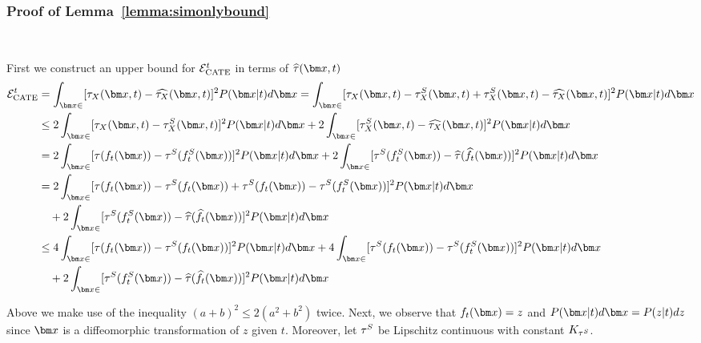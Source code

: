 {
\subsubsection{Proof of Lemma~\ref{lemma:simonlybound}}
\label{app:lemma:simonlybound}

    \lemmasimonlybound\


First we construct an upper bound for $\mathcal{E}_{\text{CATE}}^t$ in terms of $\tauhat(\xb, t)$
\begin{align*}
    \ErrITE^t &= \int_{\xb \in \xspace} [\ITEx(\xb, t) - \ITExhat(\xb, t)]^2 P(\xb|t)d\xb = \int_{\xb \in \xspace} [\ITEx(\xb, t) - \ITExSyn(\xb, t) + \ITExSyn(\xb, t) - \ITExhat(\xb, t)]^2 P(\xb|t)d\xb\\
    &\leq 2\int_{\xb \in \xspace} [\ITEx(\xb, t) - \ITExSyn(\xb, t)]^2P(\xb|t)d\xb + 2\int_{\xb \in \xspace}[\ITExSyn(\xb, t) - \ITExhat(\xb, t)]^2 P(\xb|t)d\xb\\
    &= 2\int_{\xb \in \xspace} [\tau(\RInv_t(\xb)) - \syntau(\SInv_t(\xb))]^2P(\xb|t)d\xb + 2\int_{\xb \in \xspace}[\syntau(\SInv_t(\xb)) - \tauhat(\RInvhat_t(\xb))]^2 P(\xb|t)d\xb\\
    &= 2\int_{\xb \in \xspace} [\tau(\RInv_t(\xb)) - \syntau(\RInv_t(\xb)) + \syntau(\RInv_t(\xb)) - \syntau(\SInv_t(\xb))]^2P(\xb|t)d\xb \\&\quad+ 2\int_{\xb \in \xspace}[\syntau(\SInv_t(\xb)) - \tauhat(\RInvhat_t(\xb))]^2 P(\xb|t)d\xb\\
    &\leq 4\int_{\xb \in \xspace} [\tau(\RInv_t(\xb)) - \syntau(\RInv_t(\xb))]^2P(\xb|t)d\xb + 4\int_{\xb \in \xspace}[\syntau(\RInv_t(\xb)) - \syntau(\SInv_t(\xb))]^2P(\xb|t)d\xb \\&\quad+ 2\int_{\xb \in \xspace}[\syntau(\SInv_t(\xb)) - \tauhat(\RInvhat_t(\xb))]^2 P(\xb|t)d\xb\\
\end{align*}

Above we make use of the inequality $(a+b)^2 \leq 2(a^2 + b^2)$ twice. Next, we observe that $\RInv_t(\xb) = z$ and $P(\xb|t)d\xb = P(z|t)dz$ since $\xb$ is a diffeomorphic transformation of $z$ given $t$. Moreover, let $\tau^S$ be Lipschitz continuous with constant $K_{\tau^S}$.

}
